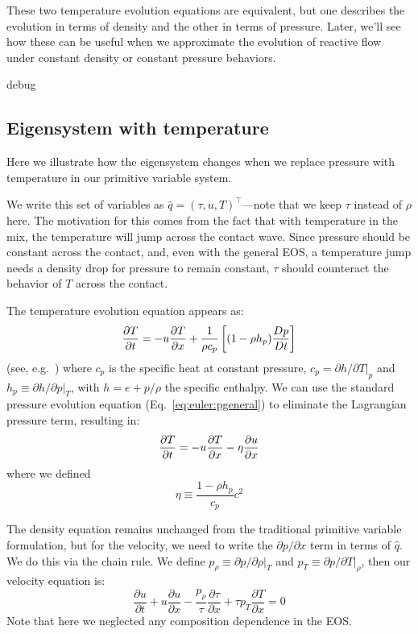 These two temperature evolution equations are equivalent, but one
describes the evolution in terms of density and the other in terms of
pressure.  Later, we'll see how these can be useful when we
approximate the evolution of reactive flow under constant density or
constant pressure behaviors.

\if debug
\subsection{Eigensystem with temperature}

Here we illustrate how the eigensystem changes when we replace pressure with
temperature in our primitive variable system.

We write this set of variables as $\hat{q} = (\tau, u,
T)^\intercal$---note that we keep $\tau$ instead of $\rho$ here.  The
motivation for this comes from the fact that with temperature in the
mix, the temperature will jump across the contact wave.  Since
pressure should be constant across the contact, and, even with the
general EOS, a temperature jump needs a density drop for pressure to
remain constant, $\tau$ should counteract the behavior of $T$ across
the contact.

The temperature evolution equation appears as:
\begin{equation}
\frac{\partial T}{\partial t} = -u{\frac{{\partial T}}{\partial x}} +
  \frac{1}{\rho c_p} \left [ (1 - \rho h_p) \frac{Dp}{Dt} \right ]
\end{equation}
(see, e.g.\ \cite{ABRZ:I}) where $c_p$ is the specific heat at
constant pressure, $c_p = \partial h/\partial T|_p$ and $h_p \equiv
\partial h / \partial p |_T$, with $h = e + p/\rho$ the specific
enthalpy.  We can use the standard pressure evolution equation
(Eq.~\ref{eq:euler:pgeneral}) to eliminate the Lagrangian pressure term,
resulting in:
\begin{equation}
\frac{\partial T}{\partial t} = -u{\frac{{\partial T}}{\partial x}} - \eta {\frac{{\partial u}}{\partial x}}
\end{equation}
where we defined
\begin{equation}
\eta \equiv \frac{1 - \rho h_p}{c_p} c^2
\end{equation}

The density equation remains unchanged from the traditional primitive
variable formulation, but for the velocity, we need to write the
$\partial p/\partial x$ term in terms of $\hat{q}$.  We do this via
the chain rule.  We define $p_\rho \equiv {\partial p}/{\partial \rho}
|_T$ and $p_T \equiv {\partial p}/{\partial T} |_\rho$, then our
velocity equation is:
\begin{equation}
\frac{\partial u}{\partial t} + u \frac{\partial u}{\partial x} - \frac{p_\rho}{\tau} \frac{\partial \tau}{\partial x} + {\tau p_T} \frac{\partial T}{\partial x} = 0
\end{equation}
Note that here we neglected any composition dependence in the EOS.

